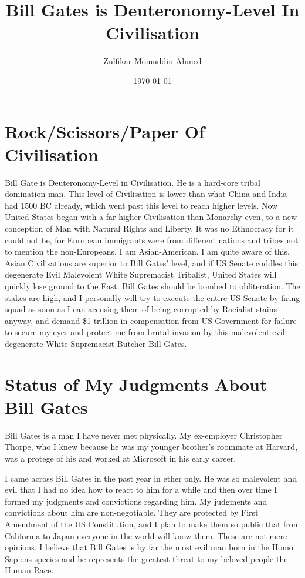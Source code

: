 \documentclass{amsart}
\title{Bill Gates is Deuteronomy-Level In Civilisation}
\author{Zulfikar Moinuddin Ahmed}
\date{\today}
\begin{document}
\maketitle

\section{Rock/Scissors/Paper Of Civilisation}

Bill Gate is Deuteronomy-Level in Civilisation.  He is a hard-core tribal domination man.  This level of Civilisation is lower than what China and India had 1500 BC already, which went past this level to reach higher levels.  Now United States began with a far higher Civilisation than Monarchy even, to a new conception of Man with Natural Rights and Liberty.  It was no Ethnocracy for it could not be, for European immigrants were from different nations and tribes not to mention the non-Europeans.  I am Asian-American.  I am quite aware of this.  Asian Civilisations are superior to Bill Gates' level, and if US Senate coddles this degenerate Evil Malevolent White Supremacist Tribalist, United States will quickly lose ground to the East.  Bill Gates should be bombed to obliteration.  The stakes are high, and I personally will try to execute the entire US Senate by firing squad as soon as I can accusing them of being corrupted by Racialist stains anyway, and demand \$1 trillion in compensation from US Government for failure to secure my eyes and protect me from brutal invasion by this malevolent evil degenerate White Supremacist Butcher Bill Gates.

\section{Status of My Judgments About Bill Gates}

Bill Gates is a man I have never met physically.  My ex-employer Christopher Thorpe, who I knew because he was my younger brother's roommate at Harvard, was a protege of his and worked at Microsoft in his early career.

I came across Bill Gates in the past year in ether only.  He was so malevolent and evil that I had no idea how to react to him for a while and then over time I formed my judgments and convictions regarding him.  My judgments and convictions about him are non-negotiable.  They are protected by First Amendment of the US Constitution, and I plan to make them so public that from California to Japan everyone in the world will know them.  These are not mere opinions.  I believe that Bill Gates is by far the most evil man born in the Homo Sapiens species and he represents the greatest threat to my beloved people the Human Race.
\end{document}
